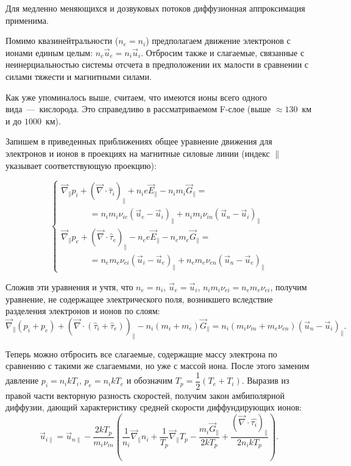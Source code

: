\documentclass[14pt, a4paper, fleqn]{extarticle}
\begin{document}
Для медленно меняющихся и дозвуковых потоков диффузионная аппроксимация применима.

\bigskip

Помимо квазинейтральности ($n_e=n_i$) предполагаем движение электронов с ионами единым целым: $n_e \vec{u}_e=n_i \vec{u}_i$. Отбросим также и слагаемые, связанные с неинерциальностью системы отсчета в предположении их малости в сравнении с силами тяжести и магнитными силами.

Как уже упоминалось выше, считаем, что имеются ионы всего одного вида~---~кислорода. Это справедливо в рассматриваемом F-слое (выше $\approx 130$~км и до $1000$~км).

Запишем в приведенных приближениях общее уравнение движения для электронов и ионов в проекциях на магнитные силовые линии (индекс $\parallel$ указывает соответствующую проекцию):

$$\begin{cases}
\vec{\nabla}_\parallel p_i + (\vec{\nabla}\cdot \hat{\tau}_i)_\parallel + n_ie\vec{E}_\parallel-n_im_i\vec{G}_\parallel=\\
\textrm{ }\textrm{ }\textrm{ }\textrm{ }\textrm{ }=n_im_i\nu_{ie}(\vec{u}_e-\vec{u}_i)_\parallel+n_im_i\nu_{in}(\vec{u}_n-\vec{u}_i)_\parallel\\
\vec{\nabla}_\parallel p_e + (\vec{\nabla}\cdot \hat{\tau}_e)_\parallel - n_ee\vec{E}_\parallel-n_em_e\vec{G}_\parallel=\\
\textrm{ }\textrm{ }\textrm{ }\textrm{ }\textrm{ }=n_em_e\nu_{ei}(\vec{u}_i-\vec{u}_e)_\parallel+n_em_e\nu_{en}(\vec{u}_n-\vec{u}_e)_\parallel
\end{cases}$$

Сложив эти уравнения и учтя, что $n_e=n_i$, $\vec{u}_e=\vec{u}_i$, $n_im_i\nu_{ei}=n_em_e\nu_{ei}$, получим уравнение, не содержащее электрического поля, возникшего вследствие разделения электронов и ионов по слоям:
$$\vec{\nabla}_\parallel (p_i+p_e) + (\vec{\nabla}\cdot (\hat{\tau}_i+\hat{\tau}_e))_\parallel-n_i(m_i+m_e)\vec{G}_\parallel=n_i(m_i\nu_{in}+m_e\nu_{en})(\vec{u}_n-\vec{u}_i)_\parallel.$$

Теперь можно отбросить все слагаемые, содержащие массу электрона по сравнению с такими же слагаемыми, но уже с массой иона. После этого заменим давление $p_i=n_ikT_i$, $p_e=n_ikT_e$ и обозначим $T_p=\dfrac{1}{2}(T_e+T_i)$. Выразив из правой части векторную разность скоростей, получим закон амбиполярной диффузии, дающий характеристику средней скорости диффундирующих ионов: 
$$\vec{u}_{i\parallel} = \vec{u}_{n\parallel} - \dfrac{2kT_p}{m_i\nu_{in}}\left(\dfrac{1}{n_i}\vec{\nabla}_\parallel n_i+\dfrac{1}{T_p}\vec{\nabla}_\parallel T_p-\dfrac{m_i\vec{G}_\parallel}{2kT_p}+\dfrac{(\vec{\nabla}\cdot\hat{\tau_i})_\parallel}{2n_ikT_p}\right).$$
\end{document}
